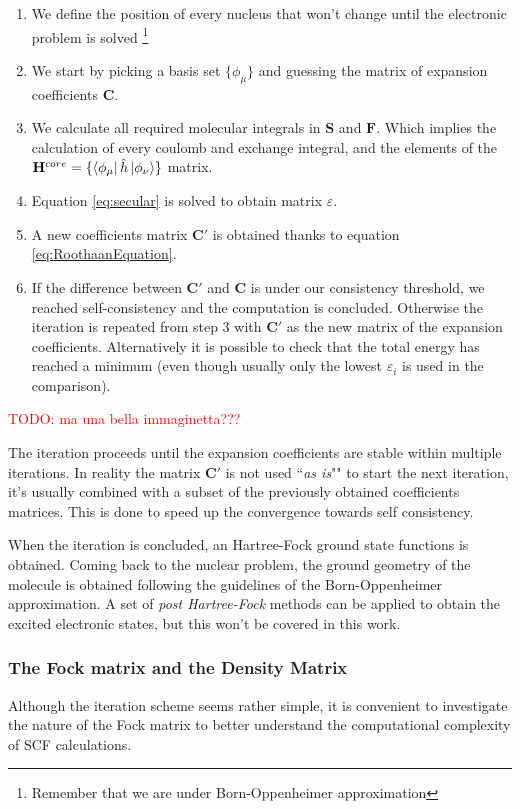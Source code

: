 \documentclass[a4paper,12pt]{article}
\newcommand\mynotes[1]{\begin{flushright}

\textcolor{red}{TODO: #1}\end{flushright}}
\begin{document}
\begin{enumerate}
	\item We define the position of every nucleus that won't change until the electronic problem is solved \footnote{Remember that we are under Born-Oppenheimer approximation}
	\item We start by picking a basis set $\{\phi_{\mu}\}$ and guessing the matrix of expansion coefficients $\mathbf{C}$.
	\item We calculate all required molecular integrals in $\mathbf{S}$ and $\mathbf{F}$. Which implies the calculation of every coulomb and exchange integral, and the elements of the $\mathbf{H}^{core} = \{\bra{\phi_{\mu}}\hat{h}\ket{\phi_{\nu}}\}$ matrix.
	\item Equation \eqref{eq:secular} is solved to obtain matrix $\varepsilon$.
	\item A new coefficients matrix $\mathbf{C'}$ is obtained thanks to equation \eqref{eq:RoothaanEquation}.
	\item If the difference between $\mathbf{C'}$ and $\mathbf{C} $ is under our consistency threshold, we reached self-consistency and the computation is concluded. Otherwise the iteration is repeated from step 3 with $\mathbf{C'}$ as the new matrix of the expansion coefficients. Alternatively it is possible to check that the total energy has reached a minimum (even though usually only the lowest $\varepsilon_i$ is used in the comparison).
\end{enumerate}

\mynotes{ma una bella immaginetta???}

The iteration proceeds until the expansion coefficients are stable within multiple iterations. In reality the matrix $\mathbf{C'}$ is not used ``\textit{as is}"" to start the next iteration, it's usually combined with a subset of the previously obtained coefficients matrices. This is done to speed up the convergence towards self consistency.

When the iteration is concluded, an Hartree-Fock ground state functions is obtained. Coming back to the nuclear problem, the ground geometry of the molecule is obtained following the guidelines of the Born-Oppenheimer approximation.
A set of \textit{post Hartree-Fock} methods can be applied to obtain the excited electronic states, but this won't be covered in this work.

\subsubsection{The Fock matrix and the Density Matrix}
Although the iteration scheme seems rather simple, it is convenient to investigate the nature of the Fock matrix to better understand the computational complexity of SCF calculations.
\end{document}
